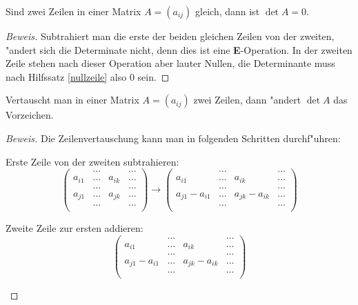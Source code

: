 \begin{hilfssatz}
Sind zwei Zeilen in einer Matrix $A=(a_{ij})$
gleich, dann ist $\det A=0$.
\end{hilfssatz}
\begin{proof}[Beweis]
Subtrahiert man die erste der beiden gleichen Zeilen von der
zweiten, "andert sich die Determinate nicht, denn dies ist eine
{\bf E}-Operation. In der zweiten Zeile stehen nach dieser Operation
aber lauter Nullen, die Determinante muss nach Hilfssatz \ref{nullzeile}
also $0$ sein.
\end{proof}

\begin{hilfssatz}
Vertauscht man in einer Matrix $A=(a_{ij})$ zwei
Zeilen, dann "andert $\det A$ das Vorzeichen.
\end{hilfssatz}
\begin{proof}[Beweis]
Die Zeilenvertauschung kann man in folgenden Schritten durchf"uhren:
\begin{compactenum}
\item Erste Zeile von der zweiten subtrahieren:
\[
\begin{pmatrix}
      &\dots&      &\dots\\
a_{i1}&\dots&a_{ik}&\dots\\
      &\dots&      &\dots\\
a_{j1}&\dots&a_{jk}&\dots\\
      &\dots&      &\dots\\
\end{pmatrix}
\rightarrow
\begin{pmatrix}
             &\dots&             &\dots\\
a_{i1}       &\dots&a_{ik}       &\dots\\
             &\dots&             &\dots\\
a_{j1}-a_{i1}&\dots&a_{jk}-a_{ik}&\dots\\
             &\dots&             &\dots\\
\end{pmatrix}
\]
\item Zweite Zeile zur ersten addieren:
\[
\begin{pmatrix}
             &\dots&             &\dots\\
a_{i1}       &\dots&a_{ik}       &\dots\\
             &\dots&             &\dots\\
a_{j1}-a_{i1}&\dots&a_{jk}-a_{ik}&\dots\\
             &\dots&             &\dots\\

\end{pmatrix}\]
\end{compactenum}
\end{proof}
